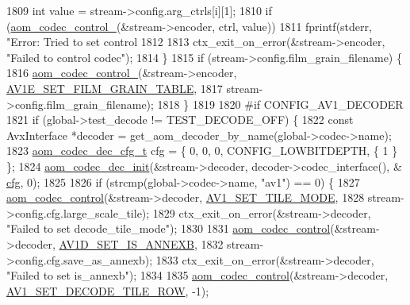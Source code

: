 \begin{DoxyCodeInclude}
{{{{{{{{{{{{{{{{{{{{{{{{{{{{{{{1809     \textcolor{keywordtype}{int} value = stream->config.arg\_ctrls[i][1];
1810     \textcolor{keywordflow}{if} (\hyperlink{group__codec_ga51eb332a40dcacc39000ab8e0be36b79}{aom\_codec\_control\_}(&stream->encoder, ctrl, value))
1811       fprintf(stderr, \textcolor{stringliteral}{"Error: Tried to set control %
1812 
1813     ctx\_exit\_on\_error(&stream->encoder, \textcolor{stringliteral}{"Failed to control codec"});
1814   \}
1815   \textcolor{keywordflow}{if} (stream->config.film\_grain\_filename) \{
1816     \hyperlink{group__codec_ga51eb332a40dcacc39000ab8e0be36b79}{aom\_codec\_control\_}(&stream->encoder, 
      \hyperlink{group__aom__encoder_ggae78dde67a6d78f332e9bdba0dde42db5ad5846c6f49d37e65a03c39e68d487097}{AV1E\_SET\_FILM\_GRAIN\_TABLE},
1817                        stream->config.film\_grain\_filename);
1818   \}
1819 
1820 \textcolor{preprocessor}{#if CONFIG\_AV1\_DECODER}
1821   \textcolor{keywordflow}{if} (global->test\_decode != TEST\_DECODE\_OFF) \{
1822     \textcolor{keyword}{const} AvxInterface *decoder = get\_aom\_decoder\_by\_name(global->codec->name);
1823     \hyperlink{structaom__codec__dec__cfg}{aom\_codec\_dec\_cfg\_t} cfg = \{ 0, 0, 0, CONFIG\_LOWBITDEPTH, \{ 1 \} \};
1824     \hyperlink{group__decoder_gafdbfca65b19ab1f6d72b32cd01753b9b}{aom\_codec\_dec\_init}(&stream->decoder, decoder->codec\_interface(), &
      \hyperlink{structaom__codec__enc__cfg_a91c4b8e91211a9cea98a8003ef2e4e65}{cfg}, 0);
1825 
1826     \textcolor{keywordflow}{if} (strcmp(global->codec->name, \textcolor{stringliteral}{"av1"}) == 0) \{
1827       \hyperlink{group__codec_ga6da974f4eeaba1fa74106b28d0fe6ac5}{aom\_codec\_control}(&stream->decoder, \hyperlink{group__aom__decoder_gga3865fd4b3192489baa9a5c3632ebe97ba0795d8084ae8c78528c01587198df9e2}{AV1\_SET\_TILE\_MODE},
1828                         stream->config.cfg.large\_scale\_tile);
1829       ctx\_exit\_on\_error(&stream->decoder, \textcolor{stringliteral}{"Failed to set decode\_tile\_mode"});
1830 
1831       \hyperlink{group__codec_ga6da974f4eeaba1fa74106b28d0fe6ac5}{aom\_codec\_control}(&stream->decoder, \hyperlink{group__aom__decoder_gga3865fd4b3192489baa9a5c3632ebe97ba1fb269c5c5913d9995b6c35d28e2a788}{AV1D\_SET\_IS\_ANNEXB},
1832                         stream->config.cfg.save\_as\_annexb);
1833       ctx\_exit\_on\_error(&stream->decoder, \textcolor{stringliteral}{"Failed to set is\_annexb"});
1834 
1835       \hyperlink{group__codec_ga6da974f4eeaba1fa74106b28d0fe6ac5}{aom\_codec\_control}(&stream->decoder, 
      \hyperlink{group__aom__decoder_gga3865fd4b3192489baa9a5c3632ebe97bac056b4cf80427fd05e3c4c9fc46edb78}{AV1\_SET\_DECODE\_TILE\_ROW}, -1);
}}}}}}}}}}}}}}}}}}}}}}}}}}}}}}}}
\end{DoxyCodeInclude}
